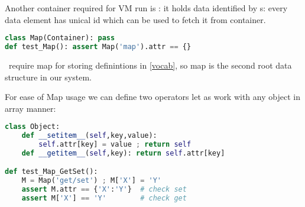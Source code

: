 \clearpage{}

\noindent Another container required for VM run is : it holds data
identified by s: every data element has unical id which can be used to
fetch it from container.

\begin{lstlisting}[language=Python]
class Map(Container): pass
def test_Map(): assert Map('map').attr == {}
\end{lstlisting}

\noindent
\F\ require map for storing definintions in  \ref{vocab}, so
map is the second root data structure in our system.

\clearpage\noindent
For ease of Map usage we can define two operators let as work with any object in
array manner:

\begin{lstlisting}[language=Python]
class Object:
	def __setitem__(self,key,value):
		self.attr[key] = value ; return self
	def __getitem__(self,key): return self.attr[key]

def test_Map_GetSet():
	M = Map('get/set') ; M['X'] = 'Y'
	assert M.attr == {'X':'Y'}  # check set
	assert M['X'] == 'Y'        # check get
\end{lstlisting}
